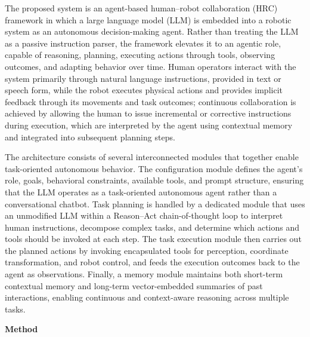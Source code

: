 The proposed system is an agent-based human–robot collaboration (HRC) framework in which a large language model (LLM) is embedded into a robotic system as an autonomous decision-making agent.
Rather than treating the LLM as a passive instruction parser, the framework elevates it to an agentic role, capable of reasoning, planning, executing actions through tools, observing outcomes, and adapting behavior over time.
Human operators interact with the system primarily through natural language instructions, provided in text or speech form, while the robot executes physical actions and provides implicit feedback through its movements and task outcomes; continuous collaboration is achieved by allowing the human to issue incremental or corrective instructions during execution, which are interpreted by the agent using contextual memory and integrated into subsequent planning steps.

The architecture consists of several interconnected modules that together enable task-oriented autonomous behavior.
The configuration module defines the agent’s role, goals, behavioral constraints, available tools, and prompt structure, ensuring that the LLM operates as a task-oriented autonomous agent rather than a conversational chatbot.
Task planning is handled by a dedicated module that uses an unmodified LLM within a Reason–Act chain-of-thought loop to interpret human instructions, decompose complex tasks, and determine which actions and tools should be invoked at each step.
The task execution module then carries out the planned actions by invoking encapsulated tools for perception, coordinate transformation, and robot control, and feeds the execution outcomes back to the agent as observations.
Finally, a memory module maintains both short-term contextual memory and long-term vector-embedded summaries of past interactions, enabling continuous and context-aware reasoning across multiple tasks.

\textbf{Method}

